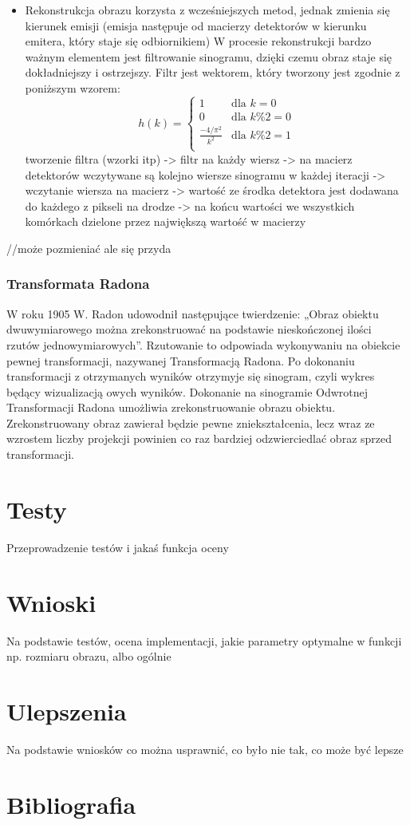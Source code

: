 \documentclass[A_4paper,12pt]{article}
\begin{document}
\begin{itemize}
\item Rekonstrukcja obrazu korzysta z wcześniejszych metod, jednak zmienia się kierunek emisji (emisja następuje od macierzy detektorów w kierunku emitera, który staje się odbiornikiem)
W procesie rekonstrukcji bardzo ważnym elementem jest filtrowanie sinogramu, dzięki czemu obraz staje się dokładniejszy i ostrzejszy.
Filtr jest wektorem, który tworzony jest zgodnie z poniższym wzorem:
\[
 h(k) =
  \begin{cases}
   1 & \text{dla } k= 0 \\
   0 & \text{dla } k\% 2 = 0 \\
   \frac{-4/\pi^2}{k^2} & \text{dla } k\% 2 = 1 \\
  \end{cases}
\]
tworzenie filtra (wzorki itp) -> filtr na każdy wiersz -> na macierz detektorów wczytywane są kolejno wiersze sinogramu w każdej iteracji -> wczytanie wiersza na macierz -> wartość ze środka detektora jest dodawana do każdego z pikseli na drodze -> na końcu wartości we wszystkich komórkach dzielone przez największą wartość w macierzy
\end{itemize}


//może pozmieniać ale się przyda
\subsubsection{Transformata Radona}
W roku 1905 W. Radon udowodnił następujące twierdzenie: „Obraz obiektu dwuwymiarowego można zrekonstruować na podstawie nieskończonej ilości rzutów jednowymiarowych”. Rzutowanie to odpowiada wykonywaniu na obiekcie pewnej transformacji, nazywanej Transformacją Radona.
Po dokonaniu transformacji z otrzymanych wyników otrzymyje się sinogram, czyli wykres będący wizualizacją owych wyników.
Dokonanie na sinogramie Odwrotnej Transformacji Radona umożliwia zrekonstruowanie obrazu obiektu. Zrekonstruowany obraz zawierał będzie pewne zniekształcenia, lecz wraz ze wzrostem liczby projekcji powinien co raz bardziej odzwierciedlać obraz sprzed transformacji.


\section{Testy}
Przeprowadzenie testów i jakaś funkcja oceny

\section{Wnioski}
Na podstawie testów, ocena implementacji, jakie parametry optymalne w funkcji np. rozmiaru obrazu, albo ogólnie

\section{Ulepszenia}
Na podstawie wniosków co można usprawnić, co było nie tak, co może być lepsze

\section{Bibliografia}


\end{document}

